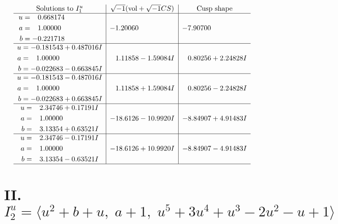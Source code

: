 \documentclass[1p]{elsarticle_modified}
\theoremstyle{definition}
\newcommand{\I}{\sqrt{-1}}
\begin{document}
$$\begin{array}{c|c|c}  
\text{Solutions to }I^u_{1}& \I (\text{vol} + \sqrt{-1}CS) & \text{Cusp shape}\\
 \hline 
\begin{aligned}
u &= \phantom{-}0.668174\phantom{ +0.000000I} \\
a &= \phantom{-}1.00000\phantom{ +0.000000I} \\
b &= -0.221718\phantom{ +0.000000I}\end{aligned}
 & -1.20060\phantom{ +0.000000I} & -7.90700\phantom{ +0.000000I} \\ \hline\begin{aligned}
u &= -0.181543 + 0.487016 I \\
a &= \phantom{-}1.00000\phantom{ +0.000000I} \\
b &= -0.022683 - 0.663845 I\end{aligned}
 & \phantom{-}1.11858 - 1.59084 I & \phantom{-}0.80256 + 2.24828 I \\ \hline\begin{aligned}
u &= -0.181543 - 0.487016 I \\
a &= \phantom{-}1.00000\phantom{ +0.000000I} \\
b &= -0.022683 + 0.663845 I\end{aligned}
 & \phantom{-}1.11858 + 1.59084 I & \phantom{-}0.80256 - 2.24828 I \\ \hline\begin{aligned}
u &= \phantom{-}2.34746 + 0.17191 I \\
a &= \phantom{-}1.00000\phantom{ +0.000000I} \\
b &= \phantom{-}3.13354 + 0.63521 I\end{aligned}
 & -18.6126 - 10.9920 I & -8.84907 + 4.91483 I \\ \hline\begin{aligned}
u &= \phantom{-}2.34746 - 0.17191 I \\
a &= \phantom{-}1.00000\phantom{ +0.000000I} \\
b &= \phantom{-}3.13354 - 0.63521 I\end{aligned}
 & -18.6126 + 10.9920 I & -8.84907 - 4.91483 I\\
 \hline 
 \end{array}$$\newpage\newpage\renewcommand{\arraystretch}{1}
\centering \section*{II. $I^u_{2}= \langle u^2+b+u,\;a+1,\;u^5+3 u^4+u^3-2 u^2- u+1 \rangle$}
\end{document}
